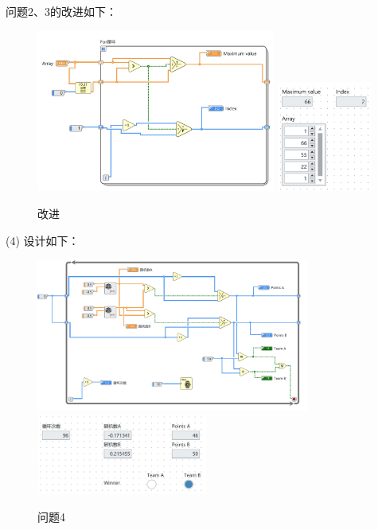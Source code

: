 \documentclass{../source/Experiment}
\begin{document}
问题2、3的改进如下：
\begin{figure}[H]
    \centering
    \includegraphics[width = 0.7\textwidth]{lab8/lab1-问题3-3-a.jpg}
    \includegraphics[width = 0.28\textwidth]{lab8/lab1-问题3-3-b.jpg}
    \caption{改进}
\end{figure}

(4)
设计如下：

\begin{figure}[H]
    \centering
    \includegraphics[width = 0.8\textwidth]{lab8/lab1-AB得分-a.jpg}
    \includegraphics[width = 0.5\textwidth]{lab8/lab1-AB得分-b.jpg}
    \caption{问题4}
\end{figure}
\end{document}
